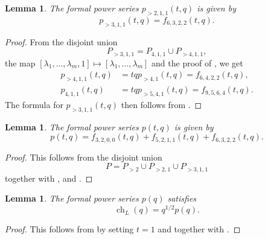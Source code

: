 \documentclass[a4paper, 12pt, reqno]{amsart}
\newtheorem{lemma}[theorem]{Lemma}
\theoremstyle{remark}
\DeclareMathOperator{\ch}{ch}
\begin{document}
\begin{lemma}
  \label{lmm:4}
  The formal power series $p_{>2, 1, 1}(t, q)$ is given by
  \begin{equation*}
    p_{>3, 1, 1}(t, q) = f_{6, 3, 2, 2}(t, q).
  \end{equation*}
\end{lemma}

\begin{proof}
  From the disjoint union
  \begin{equation*}
    P_{>3, 1, 1} = P_{4, 1, 1} \cup P_{>4, 1, 1},
  \end{equation*}
  the map $[\lambda_1, \dots, \lambda_m, 1] \mapsto [\lambda_1, \dots, \lambda_m]$ and the proof of , we get
  \begin{align*}
    p_{>4, 1, 1}(t, q) &= tqp_{>4, 1}(t, q) = f_{6, 4, 2, 2}(t, q), \\
    p_{4, 1, 1}(t, q) &= tqp_{>5, 4, 1}(t, q) = f_{9, 5, 6, 4}(t, q).
  \end{align*}
  The formula for $p_{>3, 1, 1}(t, q)$ then follows from .
\end{proof}

\begin{lemma}
  \label{lmm:5}
  The formal power series $p(t, q)$ is given by
  \begin{equation*}
    p(t, q) = f_{3, 2, 0, 0}(t, q) + f_{5, 2, 1, 1}(t, q) + f_{6, 3, 2, 2}(t, q).
  \end{equation*}
\end{lemma}

\begin{proof}
  This follows from the disjoint union
  \begin{equation*}
    P = P_{>2} \cup P_{>2, 1} \cup P_{>3, 1, 1}
  \end{equation*}
  together with ,  and .
\end{proof}

\begin{lemma}
  \label{lmm:6}
  The formal power series $p(q)$ satisfies
  \begin{equation*}
    \ch_{L}(q) = q^{1/2}p(q).
  \end{equation*}
\end{lemma}

\begin{proof}
  This follows from  by setting $t = 1$ and \cite[Theorem 4]{andrews_singular_2022} together with .
\end{proof}
\end{document}
